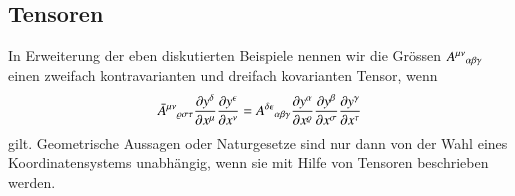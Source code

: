 \subsection{Tensoren}
In Erweiterung der eben diskutierten Beispiele nennen wir die Grössen
$
A^{\mu\nu}\mathstrut_{\alpha\beta\gamma}
$
einen zweifach kontravarianten und dreifach kovarianten Tensor, wenn
\[
\bar 
A^{\mu\nu}\mathstrut_{\varrho\sigma\tau}
\frac{\partial y^\delta}{\partial x^\mu}
\frac{\partial y^\epsilon}{\partial x^\nu}
=
A^{\delta\epsilon}\mathstrut_{\alpha\beta\gamma}
\frac{\partial y^\alpha}{\partial x^\varrho}
\frac{\partial y^\beta}{\partial x^\sigma}
\frac{\partial y^\gamma}{\partial x^\tau}
\]
gilt.
Geometrische Aussagen oder Naturgesetze sind nur dann von der Wahl
eines Koordinatensystems unabhängig, wenn sie mit Hilfe von Tensoren
beschrieben werden.

